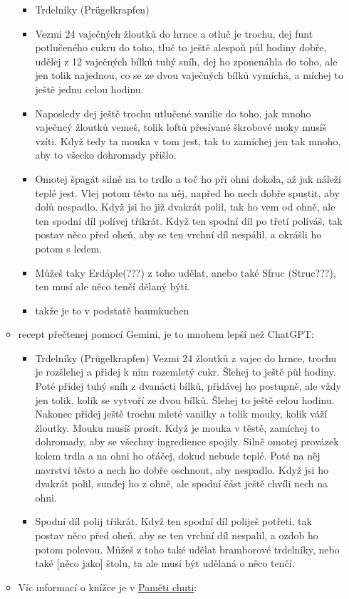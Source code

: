 \begin{itemize}
\begin{itemize}
    \begin{itemize}
    \tightlist
    \item
      Trdelníky (Prügelkrapfen)
    \item
      Vezmi 24 vaječných žloutků do hrnce a otluč je trochu, dej funt
      potlučeného cukru do toho, tluč to ještě alespoň půl hodiny dobře,
      udělej z 12 vaječných bílků tuhý sníh, dej ho zponenáhla do toho,
      ale jen tolik najednou, co se ze dvou vaječných bílků vymíchá, a
      míchej to ještě jednu celou hodinu.
    \item
      Naposledy dej ještě trochu utlučené vanilie do toho, jak mnoho
      vaječncý žloutků vemeš, tolik loftů přesívané škrobové moky musíš
      vzíti. Když tedy ta mouka v tom jest, tak to zamíchej jen tak
      mnoho, aby to všecko dohromady přišlo.
    \item
      Omotej špagát silně na to trdlo a toč ho při ohni dokola, až jak
      náleží teplé jest. Vlej potom těsto na něj, napřed ho nech dobře
      spustit, aby dolů nespadlo. Když jsi ho již dvakrát polil, tak ho
      vem od ohně, ale ten spodní díl polívej třikrát. Když ten spodní
      díl po třetí políváš, tak postav něco před oheň, aby se ten vrchní
      díl nespálil, a okrášli ho potom s ledem.
    \item
      Můžeš taky Erdáple(???) z toho udělat, anebo také Sfruc
      (Struc???), ten musí ale něco tenčí dělaný býti.
    \item
      takže je to v podstatě baumkuchen
    \end{itemize}
  \item
    recept přečtenej pomocí Gemini, je to mnohem lepší než ChatGPT:

    \begin{itemize}
    \tightlist
    \item
      Trdelníky (Prügelkrapfen) Vezmi 24 žloutků z vajec do hrnce,
      trochu je rozšlehej a přidej k nim rozemletý cukr. Šlehej to ještě
      půl hodiny. Poté přidej tuhý sníh z dvanácti bílků, přidávej ho
      postupně, ale vždy jen tolik, kolik se vytvoří ze dvou bílků.
      Šlehej to ještě celou hodinu. Nakonec přidej ještě trochu mleté
      vanilky a tolik mouky, kolik váží žloutky. Mouku musíš prosít.
      Když je mouka v těstě, zamíchej to dohromady, aby se všechny
      ingredience spojily. Silně omotej provázek kolem trdla a na ohni
      ho otáčej, dokud nebude teplé. Poté na něj navrstvi těsto a nech
      ho dobře oschnout, aby nespadlo. Když jsi ho dvakrát polil, sundej
      ho z ohně, ale spodní část ještě chvíli nech na ohni.
    \item
      Spodní díl polij třikrát. Když ten spodní díl poliješ potřetí, tak
      postav něco před oheň, aby se ten vrchní díl nespalil, a ozdob ho
      potom polevou. Můžeš z toho také udělat bramborové trdelníky, nebo
      také {[}něco jako{]} štolu, ta ale musí být udělaná o něco tenčí.
    \end{itemize}
  \item
    Víc informací o knížce je v
    \href{https://kulturni-dejiny.slu.cz/data/uploads/067/upvysledky/pamet_chuti_odborna-kniha_uplatnny_2020.pdf}{Paměti
    chuti}:


\end{itemize}
\end{itemize}
